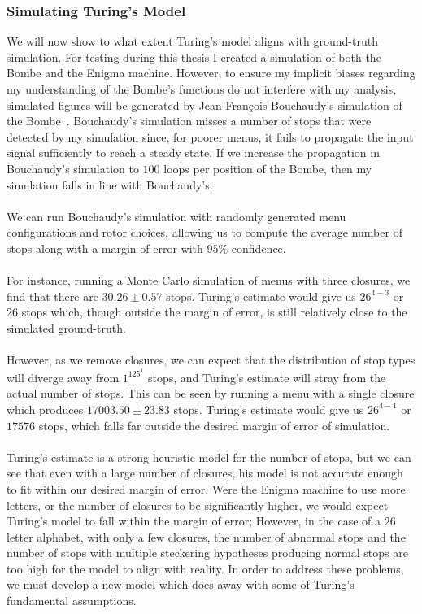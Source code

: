 \subsubsection{Simulating Turing's Model}
We will now show to what extent Turing's model aligns with
ground-truth simulation. For testing during this thesis I created a
simulation of both the Bombe and the Enigma machine. However, to
ensure my implicit biases regarding my understanding of the Bombe's
functions do not interfere with my analysis, simulated figures will
be generated by Jean-François Bouchaudy's simulation
of the Bombe~\cite{Bouchaudy2010}. Bouchaudy's simulation misses a number of
stops that were detected by my simulation since, for poorer menus, it
fails to propagate the input signal sufficiently to reach a steady
state. If we increase the propagation in Bouchaudy's simulation to $100$ loops per position of
the Bombe, then my simulation falls in line with Bouchaudy's.
\\\\We can run Bouchaudy's simulation with randomly generated menu
configurations and rotor choices, allowing us to compute the average
number of stops along with a margin of error with $95\%$ confidence.
\\\\ For instance, running a Monte Carlo simulation of menus with
three closures, we find that there are $30.26\pm0.57$ stops. Turing's
estimate would give us $26^{4-3}$ or $26$ stops which, though outside
the margin of error, is still relatively close to the simulated ground-truth.
\\\\However, as we remove closures, we can expect that the
distribution of stop types will diverge away from $1^125^1$ stops,
and Turing's estimate will stray from the actual number of stops.
This can be seen by running a menu with a single closure which
produces $17003.50\pm23.83$ stops. Turing's estimate would give us
$26^{4-1}$ or $17576$ stops, which falls far outside the desired margin
of error of simulation.
\\\\Turing's estimate is a strong heuristic model for the number of
stops, but we can see that even with a large number of closures, his
model is not accurate enough to fit within our desired margin of
error. Were the Enigma machine to use more letters, or the number of
closures to be significantly higher, we would expect Turing's model
to fall within the margin of error; However, in the case of a $26$
letter alphabet, with only a few closures, the number of abnormal
stops and the number of stops with multiple steckering hypotheses
producing normal stops are too high for the model to align with
reality. In order to address these problems, we must develop a new
model which does away with some of Turing's fundamental assumptions.
